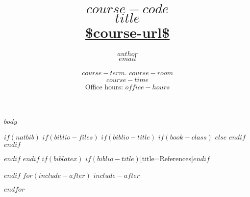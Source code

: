 \documentclass[10pt,letterpaper,article,oneside]{memoir}
\begin{document}
\title{\LARGE {\normalsize \textsc{$course-code$}\\} \HUGE $title$ \\
  \Large\url{$course-url$}}     
\author{\Large $author$\\ \small\texttt{\noindent $email$}}
\date{$course-term$. $course-room$ \\ $course-time$ \\ \small Office hours: $office-hours$} 

\maketitle

$body$

$if(natbib)$
$if(biblio-files)$
$if(biblio-title)$
$if(book-class)$
\renewcommand\bibname{Bibliography}
$else$
\renewcommand\refname{References}
$endif$
$endif$


$endif$
$endif$
$if(biblatex)$
\printbibliography$if(biblio-title)$[title=References]$endif$

$endif$
$for(include-after)$
$include-after$

$endfor$
\end{document}
